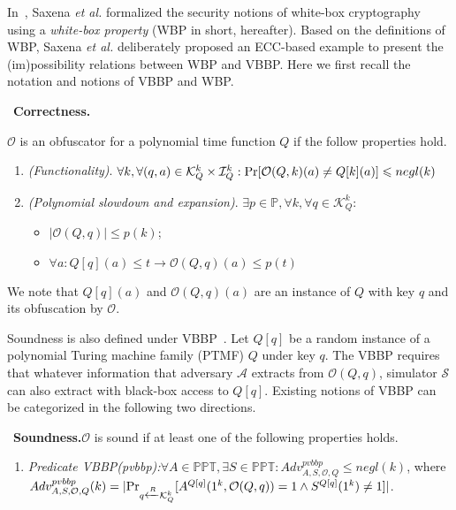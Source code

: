 \documentclass{SCIS2018}
\begin{document}
In~\cite{DBLP:conf/isw/SaxenaWP09}, Saxena \textit{et al.} formalized the security notions of white-box cryptography using a \textit{white-box property} (WBP in short, hereafter). Based on the definitions of WBP, Saxena \textit{et al.} deliberately proposed an ECC-based example to present the (im)possibility relations between WBP and VBBP. Here we first recall the notation and notions of VBBP and WBP.

\cite{DBLP:conf/isw/SaxenaWP09}~\textbf{Correctness.}{$\mathcal{O}$ is an obfuscator for a polynomial time function $Q$ if the follow properties hold.
\begin{enumerate}

\item \textit{(Functionality)}. $\forall k, \forall (q,a)\in \mathcal{K}^{k}_{Q}\times \mathcal{I}^{k}_{Q}:\textmd{Pr}[\mathcal{O}(Q,k)(a) \neq Q [k](a)]\leq negl(k)$

\item \textit{(Polynomial slowdown and expansion)}. $\exists p \in \mathbb{P}, \forall k, \forall q \in \mathcal{K}^{k}_{Q}:$
\begin{itemize}
    \item $|\mathcal{O}(Q, q)| \leq p(k)$;
    \item $\forall a: Q[q](a) \leq t \rightarrow \mathcal{O}(Q,q)(a) \leq p(t)$
\end{itemize}
\end{enumerate}

We note that $Q[q](a)$ and $\mathcal{O}(Q,q)(a)$ are an instance of $Q$ with key $q$ and its obfuscation by $\mathcal{O}$.

Soundness is also defined under VBBP~\cite{DBLP:conf/crypto/BarakGIRSVY01}. Let $Q[q]$ be a random instance of a polynomial Turing machine family (PTMF) $Q$ under key $q$. The VBBP requires that whatever information that adversary $\mathcal{A}$ extracts from $\mathcal{O}(Q,q)$, simulator $\mathcal{S}$ can also extract with black-box access to $Q[q]$. Existing notions of VBBP can be categorized in the following two directions.

\cite{DBLP:conf/isw/SaxenaWP09}~\textbf{Soundness.}{$\mathcal{O}$ is sound if at least one of the following properties holds.}
\begin{enumerate}
\item \textit{Predicate VBBP(pvbbp):}$\forall A\in \mathbb{PPT}, \exists S \in \mathbb{PPT}: Adv_{A, S, \mathcal{O}, Q}^{pvbbp} \leq negl(k)$, where \\ $Adv_{A, S, \mathcal{O}, Q}^{pvbbp}(k) =|\textmd{Pr}_{q \xleftarrow{R} \mathcal{K}^{k}_{Q}}[A^{Q[q]}(1^{k},\mathcal{O}(Q,q))=1 \wedge S^{Q[q]}(1^{k})\neq 1]|$.


\end{enumerate}}
\end{document}
